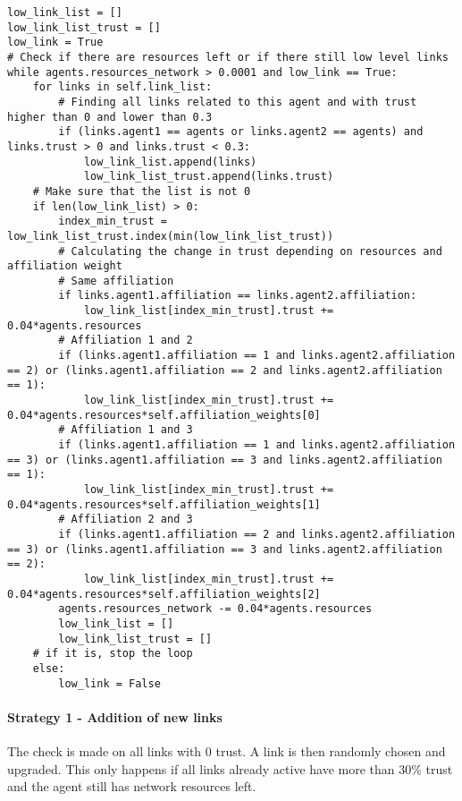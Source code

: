 \begin{lstlisting}
low_link_list = []
low_link_list_trust = []
low_link = True
# Check if there are resources left or if there still low level links
while agents.resources_network > 0.0001 and low_link == True:
	for links in self.link_list:
		# Finding all links related to this agent and with trust higher than 0 and lower than 0.3
		if (links.agent1 == agents or links.agent2 == agents) and links.trust > 0 and links.trust < 0.3:
			low_link_list.append(links)
			low_link_list_trust.append(links.trust)
	# Make sure that the list is not 0
	if len(low_link_list) > 0:
		index_min_trust = low_link_list_trust.index(min(low_link_list_trust))
		# Calculating the change in trust depending on resources and affiliation weight
		# Same affiliation
		if links.agent1.affiliation == links.agent2.affiliation:
			low_link_list[index_min_trust].trust += 0.04*agents.resources
		# Affiliation 1 and 2
		if (links.agent1.affiliation == 1 and links.agent2.affiliation == 2) or (links.agent1.affiliation == 2 and links.agent2.affiliation == 1):
			low_link_list[index_min_trust].trust += 0.04*agents.resources*self.affiliation_weights[0]
		# Affiliation 1 and 3
		if (links.agent1.affiliation == 1 and links.agent2.affiliation == 3) or (links.agent1.affiliation == 3 and links.agent2.affiliation == 1):
			low_link_list[index_min_trust].trust += 0.04*agents.resources*self.affiliation_weights[1]
		# Affiliation 2 and 3
		if (links.agent1.affiliation == 2 and links.agent2.affiliation == 3) or (links.agent1.affiliation == 3 and links.agent2.affiliation == 2):
			low_link_list[index_min_trust].trust += 0.04*agents.resources*self.affiliation_weights[2]
		agents.resources_network -= 0.04*agents.resources
		low_link_list = []
		low_link_list_trust = []
	# if it is, stop the loop
	else:
		low_link = False
\end{lstlisting}

\paragraph{Strategy 1 - Addition of new links}

The check is made on all links with 0 trust. A link is then randomly chosen and upgraded. This only happens if all links already active have more than 30\% trust and the agent still has network resources left.

